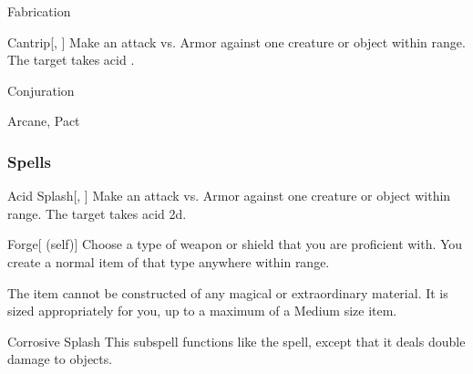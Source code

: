 \newpage
\begin{spellsection}{Fabrication}

\begin{spellheader}
\end{spellheader}


\begin{ability}{Cantrip}[, ]
Make an attack vs. Armor against one creature or object within \rngmed range.
\hit The target takes acid .
\end{ability}




 Conjuration

 Arcane, Pact
\end{spellsection}


\subsubsection{Spells}


\begin{ability}[\nth{1}]{Acid Splash}[, ]
Make an attack vs. Armor against one creature or object within \rngmed range.
\hit The target takes acid  \plus2d.
\end{ability}
\vspace{0.25em}



\begin{ability}[\nth{1}]{Forge}[ (self)]
Choose a type of weapon or shield that you are proficient with.
You create a normal item of that type anywhere within \rngclose range.

The item cannot be constructed of any magical or extraordinary material.
It is sized appropriately for you, up to a maximum of a Medium size item.
\end{ability}
\vspace{0.25em}



\begin{ability}[\nth{2}]{Corrosive Splash}
This subspell functions like the  spell, except that it deals double damage to objects.
\end{ability}
\vspace{0.25em}



